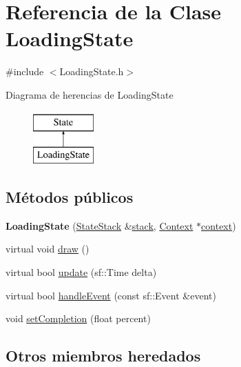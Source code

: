 \hypertarget{classLoadingState}{}\section{Referencia de la Clase Loading\+State}
\label{classLoadingState}


{\ttfamily \#include $<$Loading\+State.\+h$>$}

Diagrama de herencias de Loading\+State\begin{figure}[H]
\begin{center}
\leavevmode
\includegraphics[height=2.000000cm]{classLoadingState}
\end{center}
\end{figure}
\subsection*{Métodos públicos}
\begin{DoxyCompactItemize}
\item 
\hypertarget{classLoadingState_a44c4ab240d82642ff91498380c9d34d0}{}{\bfseries Loading\+State} (\hyperlink{classStateStack}{State\+Stack} \&\hyperlink{classState_a86c8d3a5a1ee89896828be85a785fb04}{stack}, \hyperlink{classContext}{Context} $\ast$\hyperlink{classState_adc93e8ad3199b5891618ca88eed0436a}{context})\label{classLoadingState_a44c4ab240d82642ff91498380c9d34d0}

\item 
virtual void \hyperlink{classLoadingState_adfe2c002c52cc2c49967ba3ace4aa73b}{draw} ()
\item 
virtual bool \hyperlink{classLoadingState_a8f1729b9b5ca91c0ec3918b86bfe8feb}{update} (sf\+::\+Time delta)
\item 
virtual bool \hyperlink{classLoadingState_a37da243eeeca36460bac2f32cef3e368}{handle\+Event} (const sf\+::\+Event \&event)
\item 
void \hyperlink{classLoadingState_a28bee93e7f9818084af8be6b31ee0ba4}{set\+Completion} (float percent)
\end{DoxyCompactItemize}
\subsection*{Otros miembros heredados}


